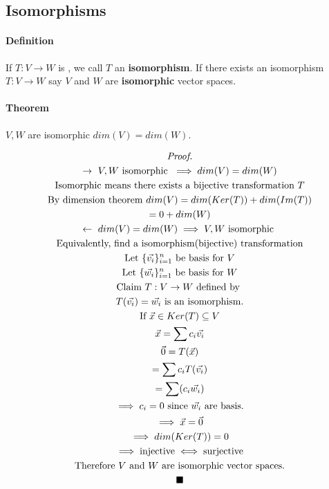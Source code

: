 \documentclass[11pt]{article}
\newcommand{\tx}[1]{\text{{#1}}}
\begin{document}
	\subsection{Isomorphisms}
	
	\paragraph{Definition} If $T: V \to W$ is , we call $T$ an \textbf{isomorphism}. If there exists an isomorphism $T: V \to W$ say $V$ and $W$ are \textbf{isomorphic} vector spaces.
	
	\paragraph{Theorem} $V,W$ are isomorphic  $dim(V) = dim(W)$.
	
	\begin{multline*}
		\emph{Proof.} \\
		\rightarrow\ V,W \text{ isomorphic } \implies dim(V) = dim(W) \\
		\text{Isomorphic means there exists a bijective transformation $T$} \\
		\text{By dimension theorem } dim(V) = dim(Ker(T)) + dim(Im(T)) \\
		= 0 + dim(W) \\
		\leftarrow\ dim(V) = dim(W) \implies V,W \text{ isomorphic } \\
		\text{Equivalently, find a isomorphism(bijective) transformation} \\
		\text{Let } \{\vec{v_i}\}_{i=1}^n \text{ be basis for } V \\
		\text{Let } \{\vec{w_i}\}_{i=1}^n \text{ be basis for } W \\
		\text{Claim } T: V \to W \text{ defined by } \\
		T(\vec{v_i}) = \vec{w_i} \text{ is an isomorphism.}\\
		\text{If } \vec{x} \in Ker(T) \subseteq V \\
		\vec{x} = \sum{c_i\vec{v_i}} \\
		\vec{0} = T(\vec{x}) \\
		= \sum{c_iT(\vec{v_i})} \\
		= \sum(c_i \vec{w_i}) \\
		\implies c_i = 0 \text{ since } \vec{w_i} \text{ are basis.} \\
		\implies \vec{x} = \vec{0} \\
		\implies dim(Ker(T)) = 0 \\
		\implies \text{injective} \iff \text{surjective} \\
		\tx{Therefore $V$ and $W$ are isomorphic vector spaces.} \\
		\blacksquare
	\end{multline*}
	
\end{document}
